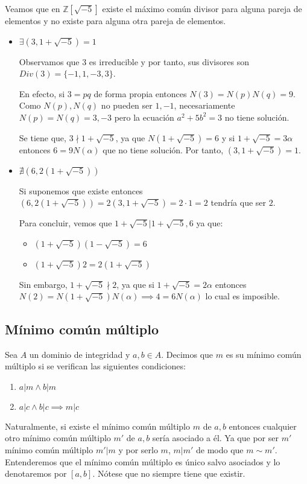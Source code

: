 \begin{example}
Veamos que en $\mathbb{Z}[\sqrt{-5}]$ existe el máximo común divisor para alguna pareja de elementos y no existe para alguna otra pareja de elementos.

\begin{itemize}
\item $\exists (3,1+\sqrt{-5}) = 1$

Observamos que $3$ es irreducible y por tanto, sus divisores son $Div(3) = \{-1,1,-3,3\}$. 

En efecto, si $3 = pq$ de forma propia entonces $N(3)= N(p)N(q) = 9$. Como $N(p),N(q)$ no pueden ser $1,-1$, necesariamente $N(p) = N(q) = 3,-3$ pero la ecuación $a^2+5b^2 = 3$ no tiene solución. 

Se tiene que, $3 \nmid 1+\sqrt{-5}$, ya que $N(1+\sqrt{-5}) = 6$  y si $1+\sqrt{-5} = 3 \alpha$ entonces $6 = 9N(\alpha)$ que no tiene solución. Por tanto, $(3,1+\sqrt{-5}) = 1$.

\item $\nexists (6,2(1+\sqrt{-5}))$

Si suponemos que existe entonces $(6,2(1+\sqrt{-5})) = 2(3,1+\sqrt{-5}) = 2 \cdot 1 = 2$ tendría que ser $2$. 

Para concluir, vemos que $1+\sqrt{-5}|1+\sqrt{-5},6$ ya que:

\begin{itemize}
\item  $(1+\sqrt{-5})(1-\sqrt{-5}) = 6$
\item  $(1+\sqrt{-5})2 = 2(1+\sqrt{-5})$
\end{itemize}

Sin embargo, $1+\sqrt{-5} \nmid 2$, ya que si $1+\sqrt{-5} = 2 \alpha$ entonces $N(2) = N(1+\sqrt{-5})N(\alpha) \implies 4 = 6  N(\alpha)$ lo cual es imposible. 
\end{itemize}
\end{example}

\subsection{Mínimo común múltiplo}

\begin{definition}
Sea $A$ un dominio de integridad y $a,b \in A$. Decimos que $m$ es su mínimo común múltiplo si se verifican las siguientes condiciones:

\begin{enumerate}
\item $a|m \land b|m$
\item $a|c \land b|c \implies m|c$
\end{enumerate}

Naturalmente, si existe el mínimo común múltiplo $m$ de $a,b$ entonces cualquier otro mínimo común múltiplo $m'$ de $a,b$ sería asociado a él. Ya que por ser $m'$ mínimo común múltiplo $m'|m$ y por serlo $m$, $m|m'$ de modo que $m \sim m'$. Entenderemos que el mínimo común múltiplo es único salvo asociados y lo denotaremos por $[a,b]$. Nótese que no siempre tiene que existir.  
\end{definition}

